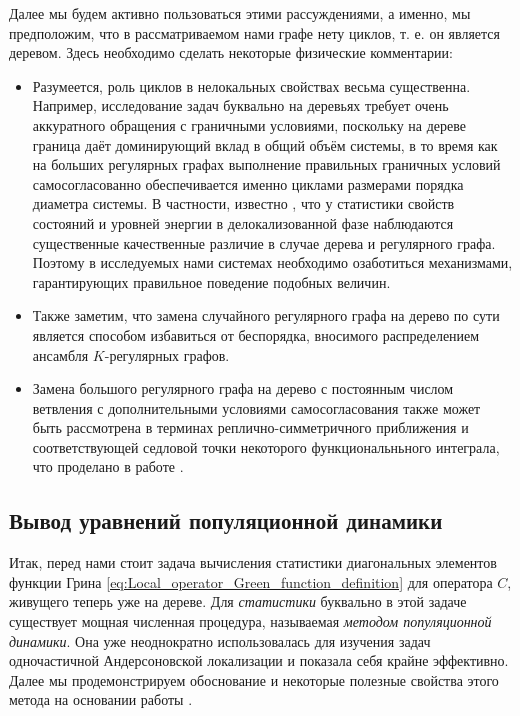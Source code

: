 Далее мы будем активно пользоваться этими рассуждениями, а именно, мы предположим, что в рассматриваемом нами графе нету циклов, т. е. он является деревом. Здесь необходимо сделать некоторые физические комментарии:
\begin{itemize}
	\item Разумеется, роль циклов в нелокальных свойствах весьма существенна. Например, исследование задач буквально на деревьях требует очень аккуратного обращения с граничными условиями, поскольку на дереве граница даёт доминирующий вклад в общий объём системы, в то время как на больших регулярных графах выполнение правильных граничных условий самосогласованно обеспечивается именно циклами размерами порядка диаметра системы. В частности, известно \cite{Tikhonov_2016}, что у статистики свойств состояний и уровней энергии в делокализованной фазе наблюдаются существенные качественные различие в случае дерева и регулярного графа. Поэтому в исследуемых нами системах необходимо озаботиться механизмами, гарантирующих правильное поведение подобных величин.
	
	\item Также заметим, что замена случайного регулярного графа на дерево по сути является способом избавиться от беспорядка, вносимого распределением ансамбля $K$-регулярных графов.
	
	\item Замена большого регулярного графа на дерево с постоянным числом ветвления с дополнительными условиями самосогласования также может быть рассмотрена в терминах реплично-симметричного приближения и соответствующей седловой точки некоторого функциональньного интеграла, что проделано в работе \cite{Metz_Castillo_2017}.
\end{itemize}


\subsection{Вывод уравнений популяционной динамики}
Итак, перед нами стоит задача вычисления статистики диагональных элементов функции Грина \eqref{eq:Local_operator_Green_function_definition} для оператора $C$, живущего теперь уже на дереве. Для \textit{статистики} буквально в этой задаче существует мощная численная процедура, называемая \textit{методом популяционной динамики}. Она уже неоднократно использовалась для изучения задач одночастичной Андерсоновской локализации \cite{Biroli_2010} и показала себя крайне эффективно. Далее мы продемонстрируем обоснование и некоторые полезные свойства этого метода на основании работы \cite{Rogers_2008}.

